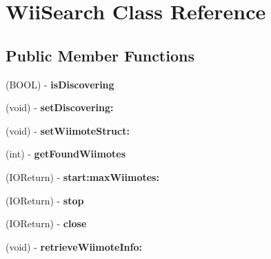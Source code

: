\hypertarget{interface_wii_search}{\section{\-Wii\-Search \-Class \-Reference}
\label{interface_wii_search}
}
\subsection*{\-Public \-Member \-Functions}
\begin{DoxyCompactItemize}
\item 
\hypertarget{interface_wii_search_aa33564fade7c3c1e01db4262d212e260}{(\-B\-O\-O\-L) -\/ {\bfseries is\-Discovering}}\label{interface_wii_search_aa33564fade7c3c1e01db4262d212e260}

\item 
\hypertarget{interface_wii_search_a6db4e4c477d44817ac956aa969ffe5eb}{(void) -\/ {\bfseries set\-Discovering\-:}}\label{interface_wii_search_a6db4e4c477d44817ac956aa969ffe5eb}

\item 
\hypertarget{interface_wii_search_a9f7f99922440f3ebcad9cead56963bed}{(void) -\/ {\bfseries set\-Wiimote\-Struct\-:}}\label{interface_wii_search_a9f7f99922440f3ebcad9cead56963bed}

\item 
\hypertarget{interface_wii_search_a3bd54d2537185d929a0b999d01495845}{(int) -\/ {\bfseries get\-Found\-Wiimotes}}\label{interface_wii_search_a3bd54d2537185d929a0b999d01495845}

\item 
\hypertarget{interface_wii_search_ae02df9b6a334bd5fba04210d618fadd5}{(\-I\-O\-Return) -\/ {\bfseries start\-:max\-Wiimotes\-:}}\label{interface_wii_search_ae02df9b6a334bd5fba04210d618fadd5}

\item 
\hypertarget{interface_wii_search_ac0561a24f7d404d599761133808e72e7}{(\-I\-O\-Return) -\/ {\bfseries stop}}\label{interface_wii_search_ac0561a24f7d404d599761133808e72e7}

\item 
\hypertarget{interface_wii_search_ad3ca7558f3482774717d91da8a879c1c}{(\-I\-O\-Return) -\/ {\bfseries close}}\label{interface_wii_search_ad3ca7558f3482774717d91da8a879c1c}

\item 
\hypertarget{interface_wii_search_a3c8ae2c10fdfe311719d7da6e9bcfa7f}{(void) -\/ {\bfseries retrieve\-Wiimote\-Info\-:}}\label{interface_wii_search_a3c8ae2c10fdfe311719d7da6e9bcfa7f}


\end{DoxyCompactItemize}
